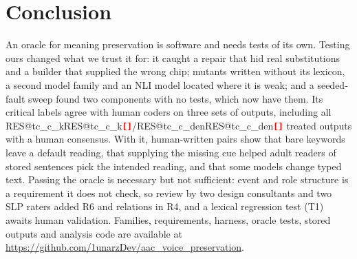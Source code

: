 \documentclass[conference,10pt]{IEEEtran}
\makeatletter
\newcommand{\RES}[1]{\ifcsname RES@#1\endcsname\csname RES@#1\endcsname\else\RESmissing{#1}\fi}
\newcommand{\RESmissing}[1]{\textcolor{red}{\textbf{\texttt{[\detokenize{#1}]}}}}
\newcommand{\kof}[1]{\RES{#1_k}/\RES{#1_den}}
\makeatother
\begin{document}
\section{Conclusion}
An oracle for meaning preservation is software and needs tests of its own.
Testing ours changed what we trust it for: it caught a repair that hid real substitutions and a builder that supplied the wrong chip; mutants written without its lexicon, a second model family and an NLI model located where it is weak; and a seeded-fault sweep found two components with no tests, which now have them.
Its critical labels agree with human coders on three sets of outputs, including all \kof{tc_c} treated outputs with a human consensus.
With it, human-written pairs show that bare keywords leave a default reading, that supplying the missing cue helped adult readers of stored sentences pick the intended reading, and that some models change typed text.
Passing the oracle is necessary but not sufficient: event and role structure is a requirement it does not check, so review by two design consultants and two SLP raters added R6 and relations in R4, and a lexical regression test (T1) awaits human validation.
Families, requirements, harness, oracle tests, stored outputs and analysis code are available at \url{https://github.com/1unarzDev/aac_voice_preservation}.
\end{document}
